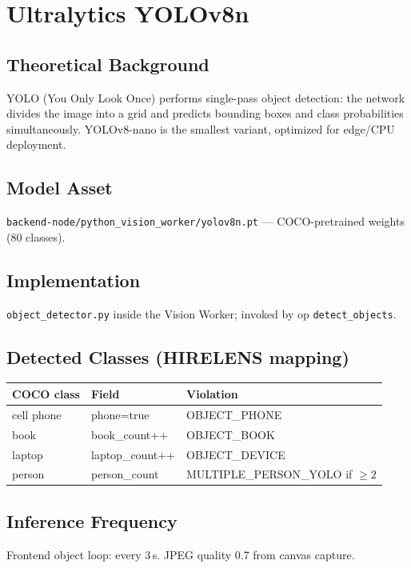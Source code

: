 \documentclass[11pt,a4paper]{report}
\begin{document}
\section{Ultralytics YOLOv8n}

\subsection{Theoretical Background}
YOLO (You Only Look Once) performs single-pass object detection: the network divides the image into a grid and predicts bounding boxes and class probabilities simultaneously. YOLOv8-nano is the smallest variant, optimized for edge/CPU deployment.

\subsection{Model Asset}
\texttt{backend-node/python\_vision\_worker/yolov8n.pt} --- COCO-pretrained weights (80 classes).

\subsection{Implementation}
\texttt{object\_detector.py} inside the Vision Worker; invoked by op \texttt{detect\_objects}.

\subsection{Detected Classes (HIRELENS mapping)}
\begin{table}[H]
\centering
\small
\begin{tabular}{@{}lll@{}}
\toprule
COCO class & Field & Violation \\
\midrule
cell phone & phone=true & OBJECT\_PHONE \\
book & book\_count++ & OBJECT\_BOOK \\
laptop & laptop\_count++ & OBJECT\_DEVICE \\
person & person\_count & MULTIPLE\_PERSON\_YOLO if $\geq 2$ \\
\bottomrule
\end{tabular}
\end{table}

\subsection{Inference Frequency}
Frontend object loop: every 3\,s. JPEG quality 0.7 from canvas capture.
\end{document}
